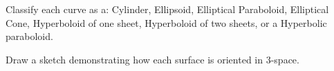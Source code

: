 \documentclass[12pt]{exam}
\begin{document}
\begin{questions}

\question Classify each curve as a: Cylinder, Ellipsoid, Elliptical Paraboloid, Elliptical Cone, Hyperboloid of one sheet, Hyperboloid of two sheets, or a Hyperbolic paraboloid. 

Draw a sketch demonstrating how each surface is oriented in 3-space. 
    \newpage


\end{questions}
\end{document}
